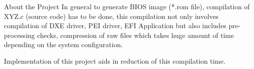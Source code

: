\begin{frame}{About the Project}
    In general to generate BIOS image (*.rom file), compilation of XYZ.c (source code) has to be done, this compilation not only involves compilation of DXE driver, PEI driver, EFI Application but also includes pre-processing checks, compression of raw files which takes huge amount of time depending on the system configuration.
    
    Implementation of this project aids in reduction of this compilation time.
\end{frame}